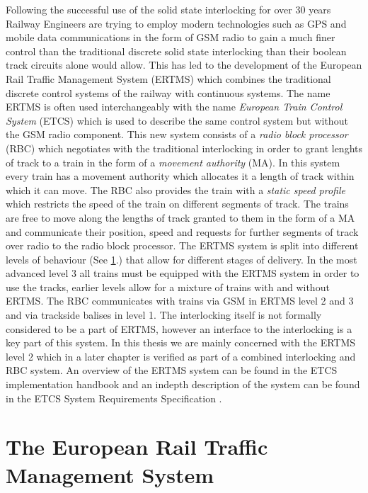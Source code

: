\label{chapter:ERTMS}

Following the successful use of the solid state interlocking for over 30 years Railway Engineers are trying to employ modern technologies such as GPS and mobile data communications in the form of GSM radio to gain a much finer control than the traditional discrete solid state interlocking than their boolean track circuits alone would allow. This has led to the development of the European Rail Traffic Management System (ERTMS) which combines the traditional discrete control systems of the railway with continuous systems. The name ERTMS is often used interchangeably with the name \emph{European Train Control System} (ETCS) which is used to describe the same control system but without the GSM radio component. This new system consists of a \emph{radio block processor} (RBC) which negotiates with the traditional interlocking in order to grant lenghts of track to a train in the form of a \emph{movement authority} (MA). In this system every train has a movement authority which allocates it a length of track within which it can move. The RBC also provides the train with a \emph{static speed profile} which restricts the speed of the train on different segments of track. The trains are free to move along the lengths of track granted to them in the form of a MA and communicate their position, speed and requests for further segments of track over radio to the radio block processor. The ERTMS system is split into different levels of behaviour (See \ref{sec:theertms}.) that allow for different stages of delivery. In the most advanced level 3 all trains must be equipped with the ERTMS system in order to use the tracks, earlier levels allow for a mixture of trains with and without ERTMS. The RBC communicates with trains via GSM in ERTMS level 2 and 3 and via trackside balises in level 1. The interlocking itself is not formally considered to be a part of ERTMS, however an interface to the interlocking is a key part of this system. In this thesis we are mainly concerned with the ERTMS level 2 which in a later chapter is verified as part of a combined interlocking and RBC system. An overview of the ERTMS system can be found in the ETCS implementation handbook \cite{ETCSHB} and an indepth description of the system can be found in the ETCS System Requirements Specification \cite{ETCSSRS}.


\section{The European Rail Traffic Management System}
\label{sec:theertms}
